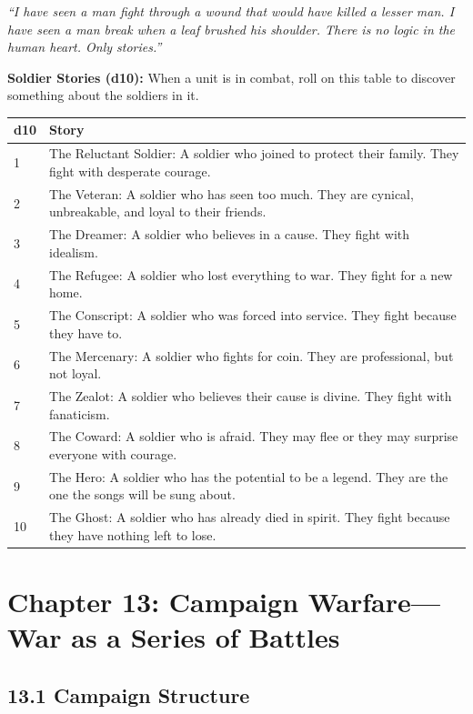 \documentclass[11pt]{article}
\begin{document}
\textit{``I have seen a man fight through a wound that would have killed a lesser man. I have seen a man break when a leaf brushed his shoulder. There is no logic in the human heart. Only stories.''}

\textbf{Soldier Stories (d10):} When a unit is in combat, roll on this table to discover something about the soldiers in it.

\begin{tabular}{|l|l|}
\hline
d10 & Story \\
\hline
1 & The Reluctant Soldier: A soldier who joined to protect their family. They fight with desperate courage. \\
\hline
2 & The Veteran: A soldier who has seen too much. They are cynical, unbreakable, and loyal to their friends. \\
\hline
3 & The Dreamer: A soldier who believes in a cause. They fight with idealism. \\
\hline
4 & The Refugee: A soldier who lost everything to war. They fight for a new home. \\
\hline
5 & The Conscript: A soldier who was forced into service. They fight because they have to. \\
\hline
6 & The Mercenary: A soldier who fights for coin. They are professional, but not loyal. \\
\hline
7 & The Zealot: A soldier who believes their cause is divine. They fight with fanaticism. \\
\hline
8 & The Coward: A soldier who is afraid. They may flee or they may surprise everyone with courage. \\
\hline
9 & The Hero: A soldier who has the potential to be a legend. They are the one the songs will be sung about. \\
\hline
10 & The Ghost: A soldier who has already died in spirit. They fight because they have nothing left to lose. \\
\hline
\end{tabular}

\section{Chapter 13: Campaign Warfare—War as a Series of Battles}

\subsection{13.1 Campaign Structure}
\end{document}
